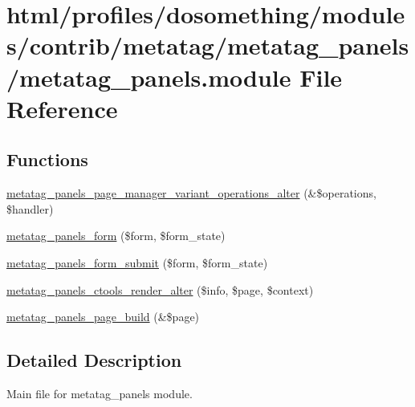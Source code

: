 \hypertarget{metatag__panels_8module}{
\section{html/profiles/dosomething/modules/contrib/metatag/metatag\_\-panels/metatag\_\-panels.module File Reference}
\label{metatag__panels_8module}
}
\subsection*{Functions}
\begin{DoxyCompactItemize}
\item 
\hyperlink{metatag__panels_8module_ac76e277f850f74fee4cf1f966660a151}{metatag\_\-panels\_\-page\_\-manager\_\-variant\_\-operations\_\-alter} (\&\$operations, \$handler)
\item 
\hyperlink{metatag__panels_8module_ab313cf7b1a9b2e97e584fb10cb7c4810}{metatag\_\-panels\_\-form} (\$form, \$form\_\-state)
\item 
\hyperlink{metatag__panels_8module_a9587bf5f8862c47d4da965c75d5cb0bf}{metatag\_\-panels\_\-form\_\-submit} (\$form, \$form\_\-state)
\item 
\hyperlink{metatag__panels_8module_a32cbb441f027447babe1a3a95999ebc8}{metatag\_\-panels\_\-ctools\_\-render\_\-alter} (\$info, \$page, \$context)
\item 
\hyperlink{metatag__panels_8module_aedd357c1991b0fcabfbaeed6f37ab2fe}{metatag\_\-panels\_\-page\_\-build} (\&\$page)
\end{DoxyCompactItemize}


\subsection{Detailed Description}
Main file for metatag\_\-panels module. 

